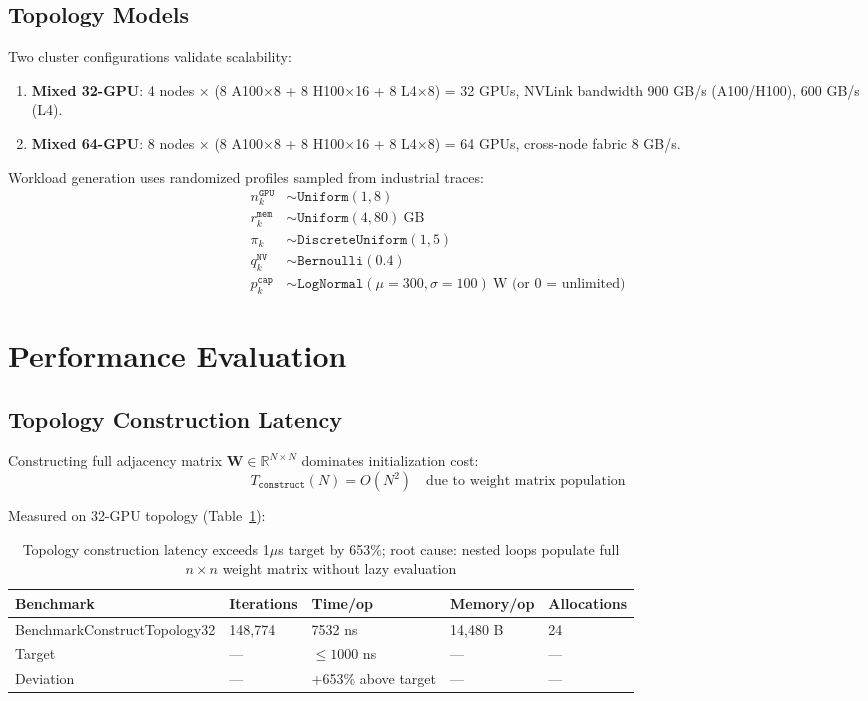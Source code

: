 \documentclass[11pt, twoside]{article}
\begin{document}
\subsection{Topology Models}

Two cluster configurations validate scalability:

\begin{enumerate}
\item \textbf{Mixed 32-GPU}: 4 nodes $\times$ (8 A100×8 + 8 H100×16 + 8 L4×8) = 32 GPUs, NVLink bandwidth 900 GB/s (A100/H100), 600 GB/s (L4).
\item \textbf{Mixed 64-GPU}: 8 nodes $\times$ (8 A100×8 + 8 H100×16 + 8 L4×8) = 64 GPUs, cross-node fabric 8 GB/s.
\end{enumerate}

Workload generation uses randomized profiles sampled from industrial traces:
\begin{align}
n_k^{\texttt{GPU}} &\sim \texttt{Uniform}(1, 8) \\
r_k^{\texttt{mem}} &\sim \texttt{Uniform}(4, 80)\ \text{GB} \\
\pi_k &\sim \texttt{DiscreteUniform}(1, 5) \\
q_k^{\texttt{NV}} &\sim \texttt{Bernoulli}(0.4) \\
p_k^{\texttt{cap}} &\sim \texttt{LogNormal}(\mu=300, \sigma=100)\ \text{W (or 0 = unlimited)}
\end{align}

\section{Performance Evaluation}

\subsection{Topology Construction Latency}

Constructing full adjacency matrix $\mathbf{W} \in \mathbb{R}^{N \times N}$ dominates initialization cost:
\begin{equation}
T_{\texttt{construct}}(N) = O(N^2) \quad \text{due to weight matrix population}
\label{eq:construct_complexity}
\end{equation}

Measured on 32-GPU topology (Table~\ref{tab:bench_construct}):

\begin{table}[h]
\centering
\begin{tabular}{lllll}
\toprule
Benchmark & Iterations & Time/op & Memory/op & Allocations \\
\midrule
BenchmarkConstructTopology32 & 148,774 & 7532 ns & 14,480 B & 24 \\
\midrule
Target & --- & $\leq 1000$ ns & --- & --- \\
Deviation & --- & +653\% above target & --- & --- \\
\bottomrule
\end{tabular}
\caption{Topology construction latency exceeds 1$\mu$s target by 653\%; root cause: nested loops populate full $n \times n$ weight matrix without lazy evaluation}
\label{tab:bench_construct}
\end{table}
\end{document}
